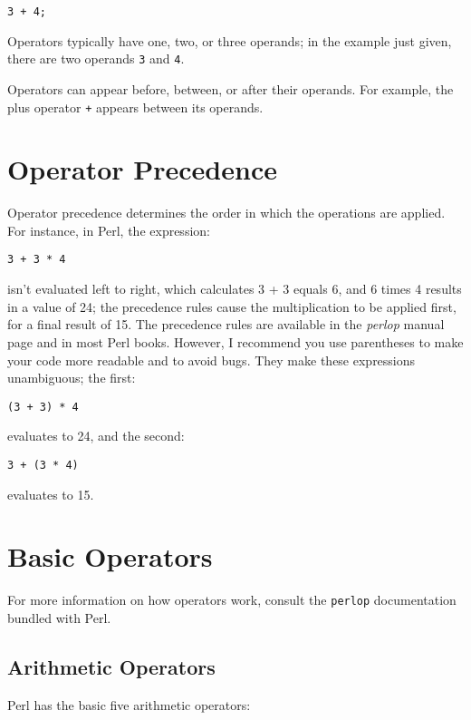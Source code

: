\begin{lstlisting}
3 + 4;
\end{lstlisting}

Operators typically have one, two, or three operands; in the example just given, there are two operands \verb|3| and \verb|4|.

Operators can appear before, between, or after their operands. For example, the plus operator \verb|+| appears between its operands.

\section{Operator Precedence}
Operator precedence determines the order in which the operations are applied. For instance, in Perl, the expression:

\begin{lstlisting}
3 + 3 * 4
\end{lstlisting}

isn't evaluated left to right, which calculates 3 + 3 equals 6, and 6 times 4 results in a value of 24; the precedence rules cause the multiplication to be applied first, for a final result of 15. The precedence rules are available in the \textit{perlop} manual page and in most Perl books. However, I recommend you use parentheses to make your code more readable and to avoid bugs. They make these expressions unambiguous; the first:

\begin{lstlisting}
(3 + 3) * 4
\end{lstlisting}

evaluates to 24, and the second:

\begin{lstlisting}
3 + (3 * 4)
\end{lstlisting}

evaluates to 15.

\section{Basic Operators}
For more information on how operators work, consult the \verb|perlop| documentation bundled with Perl. 

\subsection{Arithmetic Operators}
Perl has the basic five arithmetic operators:

